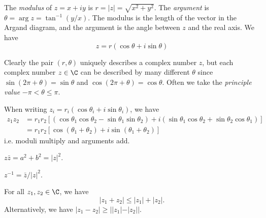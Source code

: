 \documentclass[a4paper]{article}
\begin{document}
\begin{center}
\end{center}

\begin{defi}
  The \emph{modulus} of $z = x + iy$ is $r = |z| = \sqrt{x^2 + y^2}$. The \emph{argument} is $\theta = \arg z = \tan^{-1} (y/x)$. The modulus is the length of the vector in the Argand diagram, and the argument is the angle between $z$ and the real axis. We have
  \[
  z = r(\cos\theta + i\sin \theta)
  \]

  Clearly the pair $(r, \theta)$ uniquely describes a complex number $z$, but each complex number $z\in \C$ can be described by many different $\theta$ since $\sin (2\pi + \theta) = \sin \theta$ and $\cos(2\pi + \theta) = \cos\theta$. Often we take the \emph{principle value} $-\pi < \theta \leq \pi$.
\end{defi}

When writing $z_i = r_i(\cos\theta_i + i\sin \theta_i)$, we have
\begin{align*}
  z_1z_2 &= r_1r_2[(\cos\theta_1\cos\theta_2 - \sin\theta_1\sin\theta_2) + i(\sin\theta_1\cos\theta_2 + \sin\theta_2\cos\theta_1)]\\
  &= r_1r_2[\cos(\theta_1 + \theta_2) + i\sin(\theta_1+\theta_2)]
\end{align*}
i.e. moduli multiply and arguments add.

\begin{prop}
  $z\bar{z} = a^2 + b^2 = |z|^2$.
\end{prop}

\begin{prop}
  $z^{-1} = \bar{z}/|z|^2$.
\end{prop}

\begin{thm}
  For all $z_1, z_2 \in \C$, we have
  \[
  |z_1 + z_2| \leq |z_1| + |z_2|.
  \]
  Alternatively, we have $|z_1 - z_2|\geq ||z_1| - |z_2||$.
\end{thm}
\end{document}
